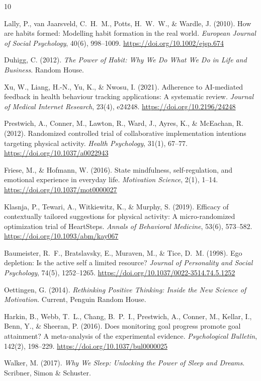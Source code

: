\documentclass[12pt,a4paper]{article}
\begin{document}
\newpage
\begin{thebibliography}{10}

Lally, P., van Jaarsveld, C.\ H.\ M., Potts, H.\ W.\ W., \& Wardle, J. (2010).
How are habits formed: Modelling habit formation in the real world.
\textit{European Journal of Social Psychology}, 40(6), 998--1009.
\url{https://doi.org/10.1002/ejsp.674}

Duhigg, C. (2012).
\textit{The Power of Habit: Why We Do What We Do in Life and Business}.
Random House.

Xu, W., Liang, H.-N., Yu, K., \& Nwosu, I. (2021).
Adherence to AI-mediated feedback in health behaviour tracking applications:
A systematic review.
\textit{Journal of Medical Internet Research}, 23(4), e24248.
\url{https://doi.org/10.2196/24248}

Prestwich, A., Conner, M., Lawton, R., Ward, J., Ayres, K., \& McEachan, R. (2012).
Randomized controlled trial of collaborative implementation intentions targeting
physical activity.
\textit{Health Psychology}, 31(1), 67--77.
\url{https://doi.org/10.1037/a0022943}

Friese, M., \& Hofmann, W. (2016).
State mindfulness, self-regulation, and emotional experience in everyday life.
\textit{Motivation Science}, 2(1), 1--14.
\url{https://doi.org/10.1037/mot0000027}

Klasnja, P., Tewari, A., Witkiewitz, K., \& Murphy, S. (2019).
Efficacy of contextually tailored suggestions for physical activity: A
micro-randomized optimization trial of HeartSteps.
\textit{Annals of Behavioral Medicine}, 53(6), 573--582.
\url{https://doi.org/10.1093/abm/kay067}

Baumeister, R.\ F., Bratslavsky, E., Muraven, M., \& Tice, D.\ M. (1998).
Ego depletion: Is the active self a limited resource?
\textit{Journal of Personality and Social Psychology}, 74(5), 1252--1265.
\url{https://doi.org/10.1037/0022-3514.74.5.1252}

Oettingen, G. (2014).
\textit{Rethinking Positive Thinking: Inside the New Science of Motivation}.
Current, Penguin Random House.

Harkin, B., Webb, T.\ L., Chang, B.\ P.\ I., Prestwich, A., Conner, M.,
Kellar, I., Benn, Y., \& Sheeran, P. (2016).
Does monitoring goal progress promote goal attainment? A meta-analysis of
the experimental evidence.
\textit{Psychological Bulletin}, 142(2), 198--229.
\url{https://doi.org/10.1037/bul0000025}

Walker, M. (2017).
\textit{Why We Sleep: Unlocking the Power of Sleep and Dreams}.
Scribner, Simon \& Schuster.

\end{thebibliography}
\end{document}

